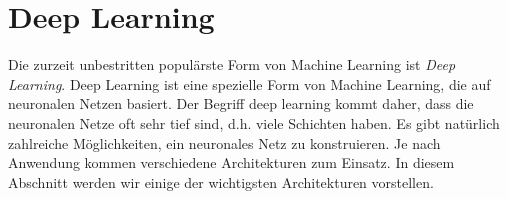 

\section{Deep Learning}

Die zurzeit unbestritten populärste Form von Machine Learning ist \textit{Deep Learning}. 
Deep Learning ist eine spezielle Form von Machine Learning, die auf neuronalen Netzen basiert.
Der Begriff deep learning kommt daher, dass die neuronalen Netze oft sehr tief sind, d.h. viele Schichten haben.
Es gibt natürlich zahlreiche Möglichkeiten, ein neuronales Netz zu konstruieren. Je nach Anwendung kommen 
verschiedene Architekturen zum Einsatz. In diesem Abschnitt werden wir einige der wichtigsten Architekturen vorstellen.

